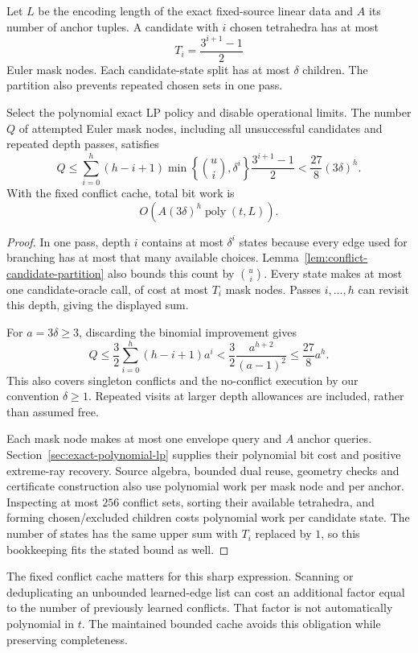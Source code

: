 Let $L$ be the encoding length of the exact fixed-source linear data and
$A$ its number of anchor tuples.  A candidate with $i$ chosen tetrahedra
has at most
\[
 T_i=\frac{3^{i+1}-1}{2}
\]
Euler mask nodes.  Each candidate-state split has at most $\delta$
children.  The partition also prevents repeated chosen sets in one pass.

\begin{proposition}
\label{prop:conflict-candidate-bound}
Select the polynomial exact LP policy and disable operational limits.
The number $Q$ of attempted Euler mask nodes, including all unsuccessful
candidates and repeated depth passes, satisfies
\[
 Q\le
 \sum_{i=0}^{h}(h-i+1)
       \min\!\left\{\binom ui,\delta^i\right\}
       \frac{3^{i+1}-1}{2}
 <\frac{27}{8}(3\delta)^h.
\]
With the fixed conflict cache, total bit work is
\[
 O\!\left(A(3\delta)^h\operatorname{poly}(t,L)\right).
\]
\end{proposition}
\begin{proof}
In one pass, depth $i$ contains at most $\delta^i$ states because every
edge used for branching has at most that many available choices.
Lemma~\ref{lem:conflict-candidate-partition} also bounds this count by
$\binom ui$.  Every state makes at most one candidate-oracle call, of
cost at most $T_i$ mask nodes.  Passes $i,\ldots,h$ can revisit this
depth, giving the displayed sum.

For $a=3\delta\ge3$, discarding the binomial improvement gives
\[
 Q\le\frac32\sum_{i=0}^{h}(h-i+1)a^i
   <\frac32\frac{a^{h+2}}{(a-1)^2}
   \le\frac{27}{8}a^h.
\]
This also covers singleton conflicts and the no-conflict execution by
our convention $\delta\ge1$.  Repeated visits at larger depth allowances
are included, rather than assumed free.

Each mask node makes at most one envelope query and $A$ anchor queries.
Section~\ref{sec:exact-polynomial-lp} supplies their polynomial bit
cost and positive extreme-ray recovery.  Source algebra, bounded dual
reuse, geometry checks and certificate construction also use polynomial
work per mask node and per anchor.  Inspecting at most $256$ conflict
sets, sorting their available tetrahedra, and forming chosen/excluded
children costs polynomial work per candidate state.  The number of
states has the same upper sum with $T_i$ replaced by $1$, so this
bookkeeping fits the stated bound as well.
\end{proof}

The fixed conflict cache matters for this sharp expression.  Scanning
or deduplicating an unbounded learned-edge list can cost an additional
factor equal to the number of previously learned conflicts.  That
factor is not automatically polynomial in $t$.  The maintained bounded
cache avoids this obligation while preserving completeness.


